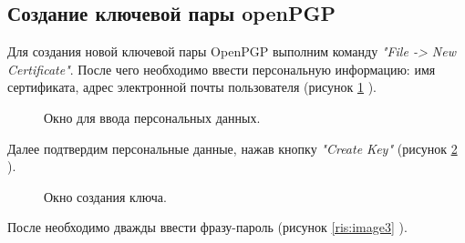\documentclass[10pt,a4paper]{report}
\begin{document}
\subsection{Создание  ключевой пары openPGP}
Для создания новой ключевой пары OpenPGP выполним команду \textit{"File -> New Certificate"}. После чего необходимо ввести персональную информацию: имя сертификата, адрес электронной почты пользователя (рисунок \ref{ris:image1} ).
\begin{figure}[ht]	
\caption{Окно для ввода персональных данных.}\label{ris:image1}
\end{figure}

Далее подтвердим персональные данные, нажав кнопку \textit{"Create Key"} (рисунок \ref{ris:image2} ).
\begin{figure}[ht]	
\caption{Окно создания ключа.}
\label{ris:image2}
\end{figure}

После необходимо дважды ввести фразу-пароль (рисунок \ref{ris:image3} ).
\end{document}
